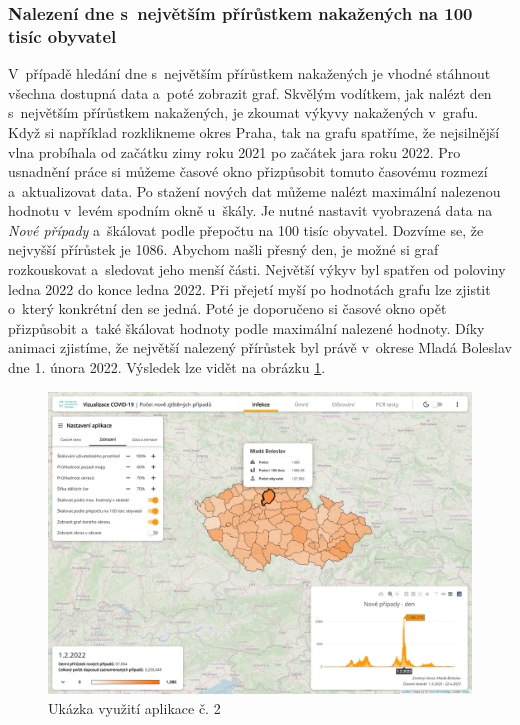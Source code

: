 \clearpage

\subsubsection*{Nalezení dne s~největším přírůstkem nakažených na 100 tisíc obyvatel}
\label{uisample}

V~případě hledání dne s~největším přírůstkem nakažených je vhodné stáhnout všechna dostupná data a~poté zobrazit graf. Skvělým vodítkem, jak nalézt den s~největším přírůstkem nakažených, je zkoumat výkyvy nakažených v~grafu. Když si například rozklikneme okres Praha, tak na grafu spatříme, že nejsilnější vlna probíhala od začátku zimy roku 2021 po začátek jara roku 2022. Pro usnadnění práce si můžeme časové okno přizpůsobit tomuto časovému rozmezí a~aktualizovat data. Po stažení nových dat můžeme nalézt maximální nalezenou hodnotu v~levém spodním okně u~škály. Je nutné nastavit vyobrazená data na \emph{Nové případy} a~škálovat podle přepočtu na 100 tisíc obyvatel. Dozvíme se, že nejvyšší přírůstek je 1086. Abychom našli přesný den, je možné si graf rozkouskovat a~sledovat jeho menší části. Největší výkyv byl spatřen od poloviny ledna 2022 do konce ledna 2022. Při přejetí myší po hodnotách grafu lze zjistit o~který konkrétní den se jedná. Poté je doporučeno si časové okno opět přizpůsobit a~také škálovat hodnoty podle maximální nalezené hodnoty. Díky animaci zjistíme, že největší nalezený přírůstek byl právě v~okrese Mladá Boleslav dne 1. února 2022. Výsledek lze vidět na obrázku \ref{fig:Showcase1}.

\begin{figure}[h]
	\centering
	\includegraphics[width=1\textwidth]{Pictures/showcase2.png}
	\caption{Ukázka využití aplikace č. 2}
	\label{fig:Showcase1}
\end{figure}

